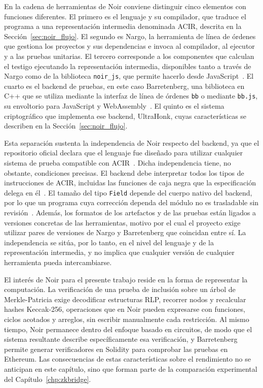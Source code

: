 En la cadena de herramientas de Noir conviene distinguir cinco elementos con funciones
diferentes. El primero es el lenguaje y su compilador, que traduce el programa a una
representación intermedia denominada ACIR, descrita en la Sección~\ref{sec:noir_flujo}. El
segundo es Nargo, la herramienta de línea de órdenes que gestiona los proyectos y sus
dependencias e invoca al compilador, al ejecutor y a las pruebas unitarias. El tercero
corresponde a los componentes que calculan el testigo ejecutando la representación intermedia,
disponibles tanto a través de Nargo como de la biblioteca \texttt{noir\_js}, que permite hacerlo
desde JavaScript~\cite{noirjsnpm}. El cuarto es el backend de pruebas, en este caso Barretenberg,
una biblioteca en C++ que se utiliza mediante la interfaz de línea de órdenes \texttt{bb} o
mediante \texttt{bb.js}, su envoltorio para JavaScript y WebAssembly~\cite{barretenbergsrc,
bbjsnpm}. El quinto es el sistema criptográfico que implementa ese backend, UltraHonk, cuyas
características se describen en la Sección~\ref{sec:noir_flujo}.

Esta separación sustenta la independencia de Noir respecto del backend, ya que el repositorio
oficial declara que el lenguaje fue diseñado para utilizar cualquier sistema de prueba compatible
con ACIR~\cite{noirrepo}. Dicha independencia tiene, no obstante, condiciones precisas. El backend
debe interpretar todos los tipos de instrucciones de ACIR, incluidas las funciones de caja negra
que la especificación delega en él~\cite{noirdocsbeta}. El tamaño del tipo \lstinline|Field|
depende del cuerpo nativo del backend, por lo que un programa cuya corrección dependa del módulo
no es trasladable sin revisión~\cite{noirdocsbeta}. Además, los formatos de los artefactos y de
las pruebas están ligados a versiones concretas de las herramientas, motivo por el cual el
proyecto exige utilizar pares de versiones de Nargo y Barretenberg que coincidan entre sí. La
independencia se sitúa, por lo tanto, en el nivel del lenguaje y de la representación
intermedia, y no implica que cualquier versión de cualquier herramienta pueda intercambiarse.

El interés de Noir para el presente trabajo reside en la forma de representar la computación.
La verificación de una prueba de inclusión sobre un árbol de Merkle-Patricia exige decodificar
estructuras RLP, recorrer nodos y recalcular hashes Keccak-256, operaciones que en Noir pueden
expresarse con funciones, ciclos acotados y arreglos, sin escribir manualmente cada restricción.
Al mismo tiempo, Noir permanece dentro del enfoque basado en circuitos, de modo que el sistema
resultante describe específicamente esa verificación, y Barretenberg permite generar
verificadores en Solidity para comprobar las pruebas en Ethereum. Las consecuencias de estas
características sobre el rendimiento no se anticipan en este capítulo, sino que forman parte de
la comparación experimental del Capítulo~\ref{chp:zkbridge}.

